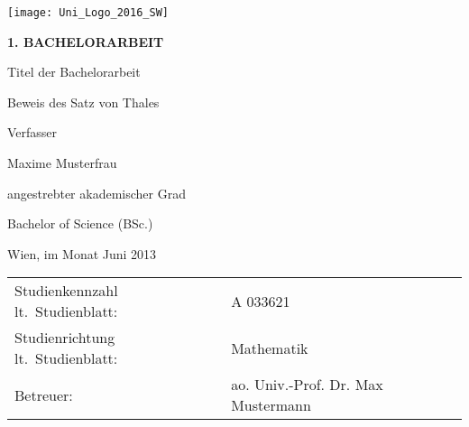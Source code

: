 \begin{titlepage}
\begin{flushright}
    \texttt{[image: Uni\_Logo\_2016\_SW]}
\end{flushright}
\vspace{1cm}

\begin{center}  %
    \Huge{\textbf{\textsf{\MakeUppercase{
        1. Bachelorarbeit
    }}}}
    \vspace{2cm}

    \large{\textsf{  %
        Titel der Bachelorarbeit
    }}
    \vspace{.1cm}

    \LARGE{\textsf{  Beweis des Satz von Thales
    }}
    \vspace{3cm}

    \large{\textsf{  %
        Verfasser
    }}

    \Large{\textsf{  Maxime Musterfrau
    }}
    \vspace{3cm}

    \large{\textsf{
        angestrebter akademischer Grad  %
    }}

    \Large{\textsf{  %
        Bachelor of Science (BSc.)
    }}
\end{center}
\vspace{2cm}

\noindent\textsf{Wien, im Monat Juni 2013}  %
\vfill

\noindent\begin{tabular}{@{}ll}
\textsf{Studienkennzahl lt.\ Studienblatt:}
&
\textsf{A 033621}  %
\\
\textsf{Studienrichtung lt.\ Studienblatt:}
&
\textsf{Mathematik}  %
\\
\textsf{Betreuer: }
&
\textsf{ao. Univ.-Prof. Dr. Max Mustermann}  %
\end{tabular}

\end{titlepage}
